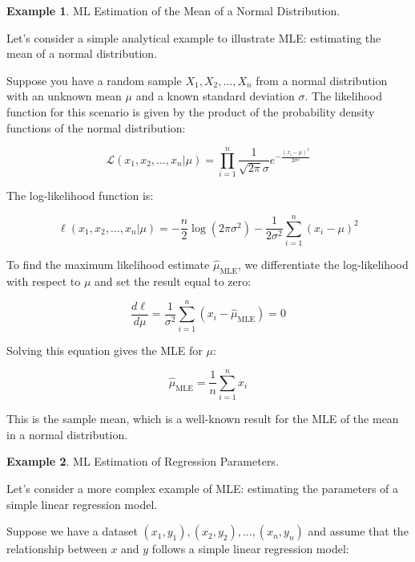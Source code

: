 \documentclass[12pt]{book}
\theoremstyle{definition}
\newtheorem{exmp}{Example}[chapter]
\begin{document}
\begin{tcolorbox}
    \begin{exmp}{ML Estimation of the Mean of a Normal Distribution.}

    Let's consider a simple analytical example to illustrate MLE: estimating the mean of a normal distribution.

\end{exmp}
\end{tcolorbox}



Suppose you have a random sample \(X_1, X_2, \ldots, X_n\) from a normal distribution with an unknown mean \(\mu\) and a known standard deviation \(\sigma\). The likelihood function for this scenario is given by the product of the probability density functions of the normal distribution:

\[ \mathcal{L}( x_1, x_2, \ldots, x_n | \mu ) = \prod_{i=1}^{n} \frac{1}{\sqrt{2\pi}\sigma} e^{-\frac{(x_i - \mu)^2}{2\sigma^2}} \]

The log-likelihood function is:

\[ \ell( x_1, x_2, \ldots, x_n | \mu) = -\frac{n}{2} \log(2\pi\sigma^2) - \frac{1}{2\sigma^2} \sum_{i=1}^{n} (x_i - \mu)^2 \]

To find the maximum likelihood estimate \(\hat{\mu}_{\text{MLE}}\), we differentiate the log-likelihood with respect to \(\mu\) and set the result equal to zero:

\[ \frac{d\ell}{d\mu} = \frac{1}{\sigma^2} \sum_{i=1}^{n} (x_i - \hat{\mu}_{\text{MLE}}) = 0 \]

Solving this equation gives the MLE for \(\mu\):

\[ \hat{\mu}_{\text{MLE}} = \frac{1}{n} \sum_{i=1}^{n} x_i \]

This is the sample mean, which is a well-known result for the MLE of the mean in a normal distribution.\\

\begin{tcolorbox}
    \begin{exmp}{ML Estimation of Regression Parameters.}
    
    Let's consider a more complex example of MLE: estimating the parameters of a simple linear regression model.
    \end{exmp}
\end{tcolorbox}


Suppose we have a dataset \((x_1, y_1), (x_2, y_2), \ldots, (x_n, y_n)\) and assume that the relationship between \(x\) and \(y\) follows a simple linear regression model:
\end{document}
